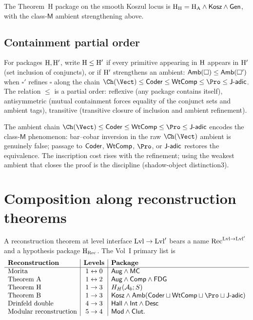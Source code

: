 \begin{example}
\label{ex:type-thmH-package}
The Theorem~H package on the smooth Koszul locus is
$\mathrm{H}_{\mathrm{H}}=\mathrm{H}_{\mathrm{A}}\wedge\mathsf{Kosz}\wedge\mathsf{Gen}$, with
the class-$\mathsf M$ ambient strengthening above.
\end{example}

\subsection*{Containment partial order}

\begin{definition}
\label{def:type-containment}
For packages $\mathrm{H},\mathrm{H}'$, write $\mathrm{H}\leq\mathrm{H}'$ if every primitive
appearing in $\mathrm{H}$ appears in $\mathrm{H}'$ (set inclusion of conjuncts),
or if $\mathrm{H}'$ strengthens an ambient: $\mathsf{Amb}(\square)\leq
\mathsf{Amb}(\square')$ when $\square'$ refines $\square$ along the chain
$\Ch(\Vect)\leq\HypCoder\leq\HypWtComp\leq\Pro\leq\HypJad$. The
relation $\leq$ is a partial order: reflexive (any package contains
itself), antisymmetric (mutual containment forces equality of the
conjunct sets and ambient tags), transitive (transitive closure of
inclusion and ambient refinement).
\end{definition}

The ambient chain
$\Ch(\Vect)\leq\HypCoder\leq\HypWtComp\leq\Pro\leq\HypJad$ encodes the
class-$\mathsf M$ phenomenon: bar--cobar inversion in the raw
$\Ch(\Vect)$ ambient is genuinely false; passage to $\mathsf{Coder}$,
$\mathsf{WtComp}$, $\Pro$, or $\mathsf{J\text{-}adic}$ restores the equivalence. The
inscription cost rises with the refinement; using the weakest ambient
that closes the proof is the discipline (shadow-object distinction3).

\section{Composition along reconstruction theorems}
\label{sec:type-composition}

A reconstruction theorem at level interface $\mathrm{Lvl}\to\mathrm{Lvl}'$
bears a name $\mathrm{Rec}^{\mathrm{Lvl}\to\mathrm{Lvl}'}$ and a hypothesis
package $\mathrm{H}_{\mathrm{Rec}}$. The Vol~I primary list is
\[
\begin{array}{l|c|l}
\textbf{Reconstruction} & \textbf{Levels} & \textbf{Package} \\
\hline
\text{Morita} &
 1\leftrightarrow 0 &
 \HypAug\wedge\HypMC \\
\text{Theorem A} &
 1\leftrightarrow 2 &
 \HypAug\wedge\HypComp\wedge\HypFinDimGr \\
\text{Theorem H} &
 1\to 3 &
 H_H(\Ab;S) \\
\text{Theorem B} &
 1\to 3 &
 \HypKosz\wedge\HypAmb(\HypCoder\joinp\HypWtComp\joinp\Pro\joinp\HypJad) \\
\text{Drinfeld double} &
 4\to 3 &
 \HypHall\wedge\HypIntegral\wedge\HypDescent \\
\text{Modular reconstruction} &
 5\to 4 &
 \HypMod\wedge\HypClut.
\end{array}
\]

